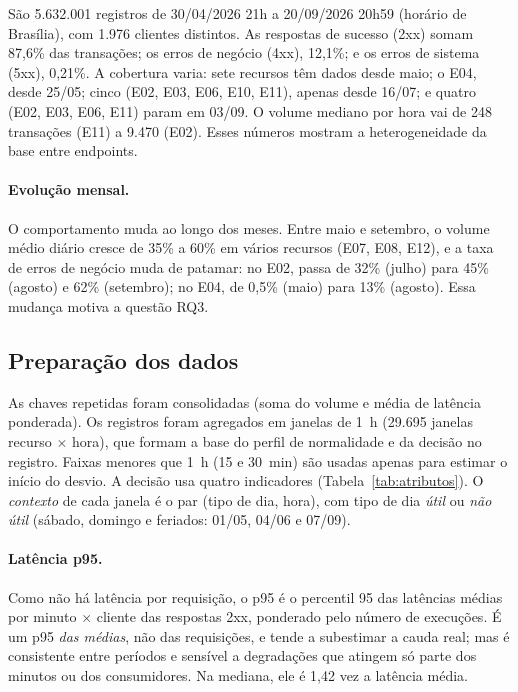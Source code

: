 \documentclass[sigconf,nonacm]{acmart}
\begin{document}
São 5.632.001 registros de 30/04/2026 21h a 20/09/2026 20h59 (horário de Brasília), com 1.976 clientes distintos. As respostas de sucesso (2xx) somam 87,6\% das transações; os erros de negócio (4xx), 12,1\%; e os erros de sistema (5xx), 0,21\%. A cobertura varia: sete recursos têm dados desde maio; o E04, desde 25/05; cinco (E02, E03, E06, E10, E11), apenas desde 16/07; e quatro (E02, E03, E06, E11) param em 03/09. O volume mediano por hora vai de 248 transações (E11) a 9.470 (E02). Esses números mostram a heterogeneidade da base entre endpoints.

\paragraph{Evolução mensal.} O comportamento muda ao longo dos meses. Entre maio e setembro, o volume médio diário cresce de 35\% a 60\% em vários recursos (E07, E08, E12), e a taxa de erros de negócio muda de patamar: no E02, passa de 32\% (julho) para 45\% (agosto) e 62\% (setembro); no E04, de 0,5\% (maio) para 13\% (agosto). Essa mudança motiva a questão RQ3.

\subsection{Preparação dos dados}
As chaves repetidas foram consolidadas (soma do volume e média de latência ponderada). Os registros foram agregados em janelas de 1~h (29.695 janelas recurso $\times$ hora), que formam a base do perfil de normalidade e da decisão no registro. Faixas menores que 1~h (15 e 30~min) são usadas apenas para estimar o início do desvio. A decisão usa quatro indicadores (Tabela~\ref{tab:atributos}). O \emph{contexto} de cada janela é o par (tipo de dia, hora), com tipo de dia \emph{útil} ou \emph{não útil} (sábado, domingo e feriados: 01/05, 04/06 e 07/09).

\paragraph{Latência p95.} Como não há latência por requisição, o p95 é o percentil 95 das latências médias por minuto $\times$ cliente das respostas 2xx, ponderado pelo número de execuções. É um p95 \emph{das médias}, não das requisições, e tende a subestimar a cauda real; mas é consistente entre períodos e sensível a degradações que atingem só parte dos minutos ou dos consumidores. Na mediana, ele é 1,42 vez a latência média.
\end{document}
